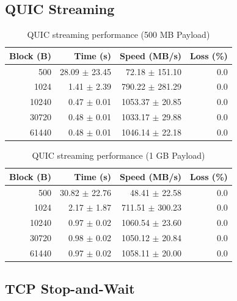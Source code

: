 \documentclass[12pt,a4paper]{article}
\begin{document}
\subsection{QUIC Streaming}

\begin{table}[H]
    \centering
    \begin{tabular}{rrrr}
        \toprule
        \textbf{Block (B)} & \textbf{Time (s)} & \textbf{Speed (MB/s)} & \textbf{Loss (\%)} \\
        \midrule
        500 & 28.09 $\pm$ 23.45 & 72.18 $\pm$ 151.10 & 0.0 \\
        1024 & 1.41 $\pm$ 2.39 & 790.22 $\pm$ 281.29 & 0.0 \\
        10240 & 0.47 $\pm$ 0.01 & 1053.37 $\pm$ 20.85 & 0.0 \\
        30720 & 0.48 $\pm$ 0.01 & 1033.17 $\pm$ 29.88 & 0.0 \\
        61440 & 0.48 $\pm$ 0.01 & 1046.14 $\pm$ 22.18 & 0.0 \\
        \bottomrule
    \end{tabular}
    \caption{QUIC streaming performance (500 MB Payload)}
    \label{tab:quic_streaming_500mb}
\end{table}

\begin{table}[H]
    \centering
    \begin{tabular}{rrrr}
        \toprule
        \textbf{Block (B)} & \textbf{Time (s)} & \textbf{Speed (MB/s)} & \textbf{Loss (\%)} \\
        \midrule
        500 & 30.82 $\pm$ 22.76 & 48.41 $\pm$ 22.58 & 0.0 \\
        1024 & 2.17 $\pm$ 1.87 & 711.51 $\pm$ 300.23 & 0.0 \\
        10240 & 0.97 $\pm$ 0.02 & 1060.54 $\pm$ 23.60 & 0.0 \\
        30720 & 0.98 $\pm$ 0.02 & 1050.12 $\pm$ 20.84 & 0.0 \\
        61440 & 0.97 $\pm$ 0.02 & 1058.11 $\pm$ 20.00 & 0.0 \\
        \bottomrule
    \end{tabular}
    \caption{QUIC streaming performance (1 GB Payload)}
    \label{tab:quic_streaming_1gb}
\end{table}

\subsection{TCP Stop-and-Wait}
\end{document}
